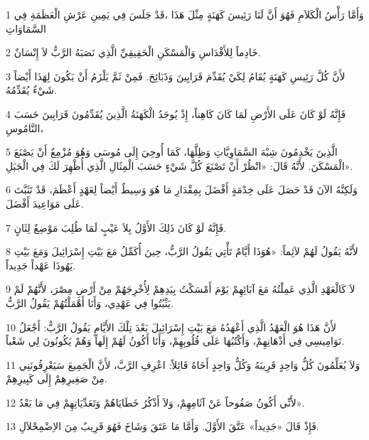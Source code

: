 \par 1 وَأَمَّا رَأْسُ الْكَلاَمِ فَهُوَ أَنَّ لَنَا رَئِيسَ كَهَنَةٍ مِثْلَ هَذَا ،قَدْ جَلَسَ فِي يَمِينِ عَرْشِ الْعَظَمَةِ فِي السَّمَاوَاتِ
\par 2 خَادِماً لِلأَقْدَاسِ وَالْمَسْكَنِ الْحَقِيقِيِّ الَّذِي نَصَبَهُ الرَّبُّ لاَ إِنْسَانٌ.
\par 3 لأَنَّ كُلَّ رَئِيسِ كَهَنَةٍ يُقَامُ لِكَيْ يُقَدِّمَ قَرَابِينَ وَذَبَائِحَ. فَمِنْ ثَمَّ يَلْزَمُ أَنْ يَكُونَ لِهَذَا أَيْضاً شَيْءٌ يُقَدِّمُهُ.
\par 4 فَإِنَّهُ لَوْ كَانَ عَلَى الأَرْضِ لَمَا كَانَ كَاهِناً، إِذْ يُوجَدُ الْكَهَنَةُ الَّذِينَ يُقَدِّمُونَ قَرَابِينَ حَسَبَ النَّامُوسِ،
\par 5 الَّذِينَ يَخْدِمُونَ شِبْهَ السَّمَاوِيَّاتِ وَظِلَّهَا، كَمَا أُوحِيَ إِلَى مُوسَى وَهُوَ مُزْمِعٌ أَنْ يَصْنَعَ الْمَسْكَنَ. لأَنَّهُ قَالَ: «انْظُرْ أَنْ تَصْنَعَ كُلَّ شَيْءٍ حَسَبَ الْمِثَالِ الَّذِي أُظْهِرَ لَكَ فِي الْجَبَلِ».
\par 6 وَلَكِنَّهُ الآنَ قَدْ حَصَلَ عَلَى خِدْمَةٍ أَفْضَلَ بِمِقْدَارِ مَا هُوَ وَسِيطٌ أَيْضاً لِعَهْدٍ أَعْظَمَ، قَدْ تَثَبَّتَ عَلَى مَوَاعِيدَ أَفْضَلَ.
\par 7 فَإِنَّهُ لَوْ كَانَ ذَلِكَ الأَوَّلُ بِلاَ عَيْبٍ لَمَا طُلِبَ مَوْضِعٌ لِثَانٍ.
\par 8 لأَنَّهُ يَقُولُ لَهُمْ لاَئِماً: «هُوَذَا أَيَّامٌ تَأْتِي يَقُولُ الرَّبُّ، حِينَ أُكَمِّلُ مَعَ بَيْتِ إِسْرَائِيلَ وَمَعَ بَيْتِ يَهُوذَا عَهْداً جَدِيداً.
\par 9 لاَ كَالْعَهْدِ الَّذِي عَمِلْتُهُ مَعَ آبَائِهِمْ يَوْمَ أَمْسَكْتُ بِيَدِهِمْ لِأُخْرِجَهُمْ مِنْ أَرْضِ مِصْرَ، لأَنَّهُمْ لَمْ يَثْبُتُوا فِي عَهْدِي، وَأَنَا أَهْمَلْتُهُمْ يَقُولُ الرَّبُّ.
\par 10 لأَنَّ هَذَا هُوَ الْعَهْدُ الَّذِي أَعْهَدُهُ مَعَ بَيْتِ إِسْرَائِيلَ بَعْدَ تِلْكَ الأَيَّامِ يَقُولُ الرَّبُّ: أَجْعَلُ نَوَامِيسِي فِي أَذْهَانِهِمْ، وَأَكْتُبُهَا عَلَى قُلُوبِهِمْ، وَأَنَا أَكُونُ لَهُمْ إِلَهاً وَهُمْ يَكُونُونَ لِي شَعْباً.
\par 11 وَلاَ يُعَلِّمُونَ كُلُّ وَاحِدٍ قَرِيبَهُ وَكُلُّ وَاحِدٍ أَخَاهُ قَائِلاً: اعْرِفِ الرَّبَّ، لأَنَّ الْجَمِيعَ سَيَعْرِفُونَنِي مِنْ صَغِيرِهِمْ إِلَى كَبِيرِهِمْ.
\par 12 لأَنِّي أَكُونُ صَفُوحاً عَنْ آثَامِهِمْ، وَلاَ أَذْكُرُ خَطَايَاهُمْ وَتَعَدِّيَاتِهِمْ فِي مَا بَعْدُ».
\par 13 فَإِذْ قَالَ «جَدِيداً» عَتَّقَ الأَوَّلَ. وَأَمَّا مَا عَتَقَ وَشَاخَ فَهُوَ قَرِيبٌ مِنَ الاِضْمِحْلاَلِ.

